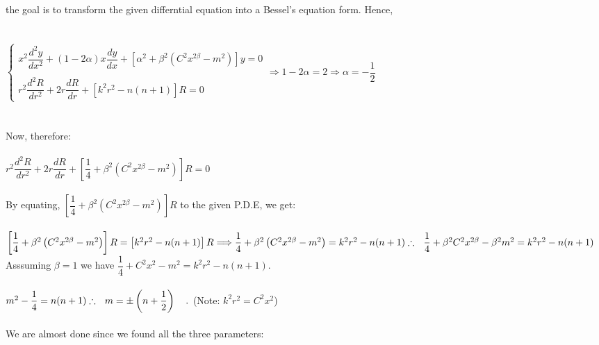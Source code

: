 \documentclass[fleqn]{article}
\begin{document}
\begin{enumerate}
{        the goal is to transform the given differntial equation into a Bessel's equation form. Hence, \\
        \\
        \\
        $
          \begin{cases}
            x^2 \dfrac{d^2 y}{dx^2}+\left(1-2 \alpha\right)x\dfrac{dy}{dx}+\left[\alpha^2+\beta^2\left(C^2 x^{2\beta}-m^2\right)\right]y=0 \\
            \\
            r^2 \dfrac{d^2 R}{dr^2}+2r \dfrac{dR}{dr}+\left[k^2r^2-n(n+1)\right]R=0
          \end{cases} \Rightarrow 1-2 \alpha=2 \Rightarrow \alpha=-\dfrac{1}{2}
        $ \\
        \\ 
        \\
        Now, therefore: \\
        \\
        $
          r^2 \dfrac{d^2 R}{dr^2}+2r \dfrac{dR}{dr}+\left[\dfrac{1}{4}+\beta^2\left(C^2 x^{2\beta}-m^2\right)\right]R=0
        $ \\
        \\
        By equating, $\left[\dfrac{1}{4}+\beta^2\left(C^2 x^{2\beta}-m^2\right)\right]R$ to the given P.D.E, we get: \\
        \\
        $
          \left[\dfrac{1}{4}+\beta^2\left(C^2 x^{2\beta}-m^2\right)\right]R=\left[k^2r^2-n(n+1)\right]R \Longrightarrow 
          \dfrac{1}{4}+\beta^2\left(C^2 x^{2\beta}-m^2\right)=k^2r^2-n(n+1) \\
          \\
          \\
          \therefore ~~ \dfrac{1}{4}+\beta^2 C^2 x^{2\beta}-\beta^2 m^2=k^2r^2-n(n+1) \\
          \\
        $
        Asssuming $\beta=1$ we have $\dfrac{1}{4}+C^2 x^2-m^2=k^2r^2-n(n+1)$.\\ \\
        $
          m^2-\dfrac{1}{4}=n(n+1) \\
          \\
          \therefore ~~ m=\pm \left(n+\dfrac{1}{2}\right) ~~~.
        $ (Note: $k^2 r^2=C^2 x^2$) \\
        \\
        We are almost done since we found all the three parameters: \\
}
\end{enumerate}
\end{document}
